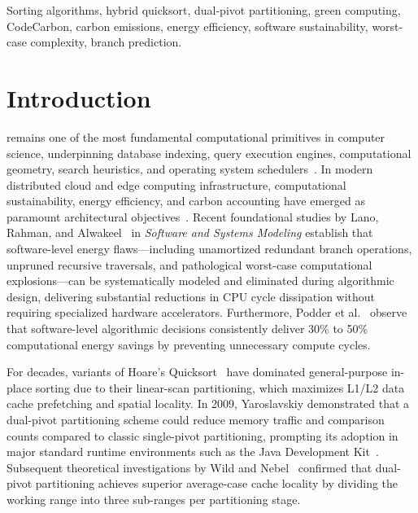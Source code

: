 \documentclass[journal]{IEEEtran}
\begin{document}
\begin{IEEEkeywords}
Sorting algorithms, hybrid quicksort, dual-pivot partitioning, green computing, CodeCarbon, carbon emissions, energy efficiency, software sustainability, worst-case complexity, branch prediction.
\end{IEEEkeywords}

\section{Introduction}
 remains one of the most fundamental computational primitives in computer science, underpinning database indexing, query execution engines, computational geometry, search heuristics, and operating system schedulers~\cite{hoare1962quicksort,knuth1998art,bentley1993engineering}. In modern distributed cloud and edge computing infrastructure, computational sustainability, energy efficiency, and carbon accounting have emerged as paramount architectural objectives~\cite{garciamireles2026sustainability,devadas2026carbon,roy2026taxonomy,carbonefficient2024slr,greenmetrics2025slr}. Recent foundational studies by Lano, Rahman, and Alwakeel~\cite{lano2026model} in \textit{Software and Systems Modeling} establish that software-level energy flaws---including unamortized redundant branch operations, unpruned recursive traversals, and pathological worst-case computational explosions---can be systematically modeled and eliminated during algorithmic design, delivering substantial reductions in CPU cycle dissipation without requiring specialized hardware accelerators. Furthermore, Podder et al.~\cite{podder2026green} observe that software-level algorithmic decisions consistently deliver 30\% to 50\% computational energy savings by preventing unnecessary compute cycles.

For decades, variants of Hoare's Quicksort~\cite{hoare1962quicksort} have dominated general-purpose in-place sorting due to their linear-scan partitioning, which maximizes L1/L2 data cache prefetching and spatial locality. In 2009, Yaroslavskiy demonstrated that a dual-pivot partitioning scheme could reduce memory traffic and comparison counts compared to classic single-pivot partitioning, prompting its adoption in major standard runtime environments such as the Java Development Kit~\cite{yaroslavskiy2009dual}. Subsequent theoretical investigations by Wild and Nebel~\cite{wild2012average} confirmed that dual-pivot partitioning achieves superior average-case cache locality by dividing the working range into three sub-ranges per partitioning stage.
\end{document}
